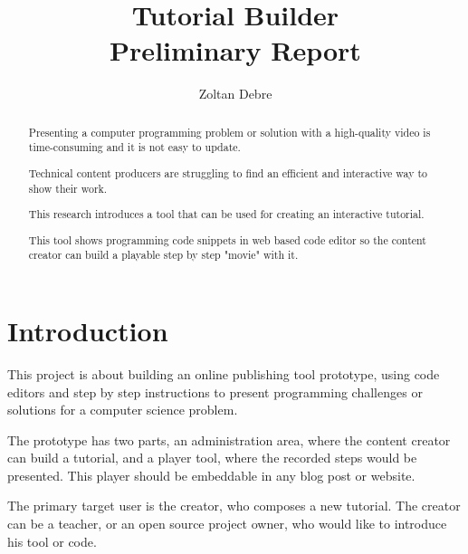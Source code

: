 \documentclass[11pt, a4paper, twoside, openright]{report}
\title{%
Tutorial Builder \\
\large Preliminary Report}
\author{Zoltan Debre}
\begin{document}
\frontmatter



\begin{abstract}

  Presenting a computer programming problem or solution with a high-quality video is time-consuming and it is not easy to update.

  Technical content producers are struggling to find an efficient and interactive way to show their work.

This research introduces a tool that can be used for creating an interactive tutorial.

This tool shows programming code snippets in web based code editor so the content creator can build a playable step by step "movie" with it.

\end{abstract}


\maketitle

\tableofcontents


\mainmatter


\chapter{Introduction}

This project is about building an online publishing tool prototype, using code editors and step by step instructions to present programming challenges or solutions for a computer science problem.

The prototype has two parts, an administration area, where the content creator can build a tutorial, and a player tool, where the recorded steps would be presented. This player should be embeddable in any blog post or website.

The primary target user is the creator, who composes a new tutorial. The creator can be a teacher, or an open source project owner, who would like to introduce his tool or code.
\end{document}
